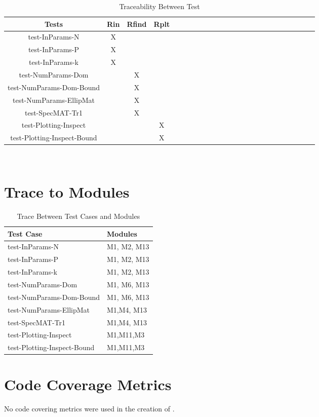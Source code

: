 \documentclass[12pt, titlepage]{article}
\begin{document}
\label{trace1}
\begin{table}[h]
	\centering
	\begin{tabular}{|c|c|c|c|c|c|c|c|c|c|c|c|c|c|c|c|c|c|c|c|c|c|c|c|}
		\hline        
		Tests & Rin& Rfind & Rplt  \\
		\hline
		test-InParams-N     &X & &   \\ \hline
		test-InParams-P    &X& &    \\ \hline
		test-InParams-k    &X & &   \\ \hline 
		test-NumParams-Dom    & &X &     \\ \hline 
		test-NumParams-Dom-Bound    & &X &    \\ \hline 
		test-NumParams-EllipMat    & &X &     \\ \hline 
		test-SpecMAT-Tr1  & &X &    \\ \hline 
		test-Plotting-Inspect & & &X     \\ \hline 
		test-Plotting-Inspect-Bound  & & &X   \\
		\hline
	\end{tabular}\\
	\caption{Traceability Between Test }
	\label{Table:D_1}
\end{table} 		

	
\section{Trace to Modules} \label{trace2}
\clearpage
\begin{table}
	\centering
	\begin{tabular}{p{} p{}}
		\toprule
		\textbf{Test Case} & \textbf{Modules}\\
		\midrule
		test-InParams-N & M1, M2, M13\\
		test-InParams-P & M1, M2, M13\\
		test-InParams-k & M1, M2, M13\\
		test-NumParams-Dom & M1, M6, M13\\
		test-NumParams-Dom-Bound & M1, M6, M13\\
		test-NumParams-EllipMat & M1,M4, M13\\
		test-SpecMAT-Tr1 &M1,M4, M13 \\
		test-Plotting-Inspect & M1,M11,M3 \\
		test-Plotting-Inspect-Bound & M1,M11,M3 \\
		\bottomrule
	\end{tabular}
	\caption{Trace Between Test Cases and Modules}
	\label{TblRT}
\end{table}	

\section{Code Coverage Metrics} 

No code covering metrics were used in the creation of \progname.




\end{document}
